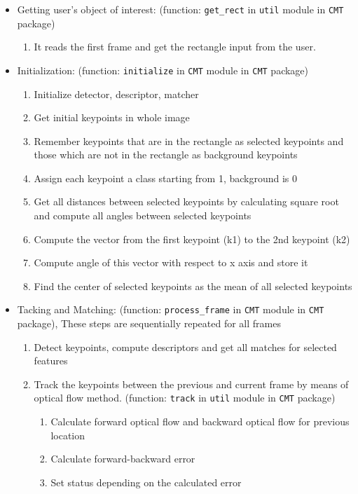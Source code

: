 \documentclass[[12pt,DIV14,BCOR12mm,a4paper,footexclude,headinclude,halfparskip-,twoside,openright,cleardoubleempty,idxtotoc,bibtotoc]{article}
\begin{document}
\begin{itemize}


  \item Getting user's object of interest: (function:  \texttt{get\_rect} in \texttt{util} module in \texttt{CMT} package)
  \begin{enumerate}
    \item It reads the first frame and get the rectangle input from the user.
  \end{enumerate}

\item Initialization:  (function: \texttt{initialize} in \texttt{CMT} module in \texttt{CMT} package)
  \begin{enumerate}
    	\item Initialize detector, descriptor, matcher
  	  \item Get initial keypoints in whole image
	\item Remember keypoints that are in the rectangle as selected keypoints and those which are not in the rectangle as background keypoints
	\item Assign each keypoint a class starting from 1, background is 0
	\item Get all distances between selected keypoints by calculating square root and compute all angles between selected keypoints
	\item Compute the vector from the first keypoint (k1) to the 2nd keypoint (k2)
	\item Compute angle of this vector with respect to x axis and store it
	\item Find the center of selected keypoints as the mean of all selected keypoints
  \end{enumerate}


  \item Tacking and Matching: (function: \texttt{process\_frame} in \texttt{CMT} module in \texttt{CMT} package), These steps are sequentially repeated for all frames
  \begin{enumerate}
    	\item Detect keypoints, compute descriptors and get all matches for selected features
	\item Track the keypoints between the previous and current frame by means of optical flow method. (function: \texttt{track} in \texttt{util} module in \texttt{CMT} package)

\begin{enumerate}
    	\item Calculate forward optical flow and backward optical flow for previous location
   	 \item Calculate forward-backward error
	\item Set status depending on the calculated error
  \end{enumerate}


\end{enumerate}
\end{itemize}
\end{document}
